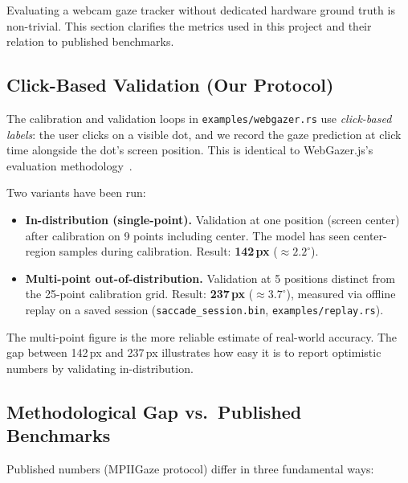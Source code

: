\documentclass[11pt,a4paper]{article}
\begin{document}
Evaluating a webcam gaze tracker without dedicated hardware ground truth is non-trivial.
This section clarifies the metrics used in this project and their relation to published benchmarks.

\subsection{Click-Based Validation (Our Protocol)}

The calibration and validation loops in \texttt{examples/webgazer.rs} use \textit{click-based labels}: the user clicks on a visible dot, and we record the gaze prediction at click time alongside the dot's screen position.
This is identical to WebGazer.js's evaluation methodology~\cite{papoutsaki2016webgazer}.

Two variants have been run:

\begin{itemize}
  \item \textbf{In-distribution (single-point).} Validation at one position (screen center) after calibration on 9 points including center. The model has seen center-region samples during calibration. Result: \textbf{142\,px} ($\approx 2.2^\circ$).
  \item \textbf{Multi-point out-of-distribution.} Validation at 5 positions distinct from the 25-point calibration grid. Result: \textbf{237\,px} ($\approx 3.7^\circ$), measured via offline replay on a saved session (\texttt{saccade\_session.bin}, \texttt{examples/replay.rs}).
\end{itemize}

The multi-point figure is the more reliable estimate of real-world accuracy.
The gap between 142\,px and 237\,px illustrates how easy it is to report optimistic numbers by validating in-distribution.

\subsection{Methodological Gap vs.\ Published Benchmarks}

Published numbers (MPIIGaze protocol) differ in three fundamental ways:
\end{document}
